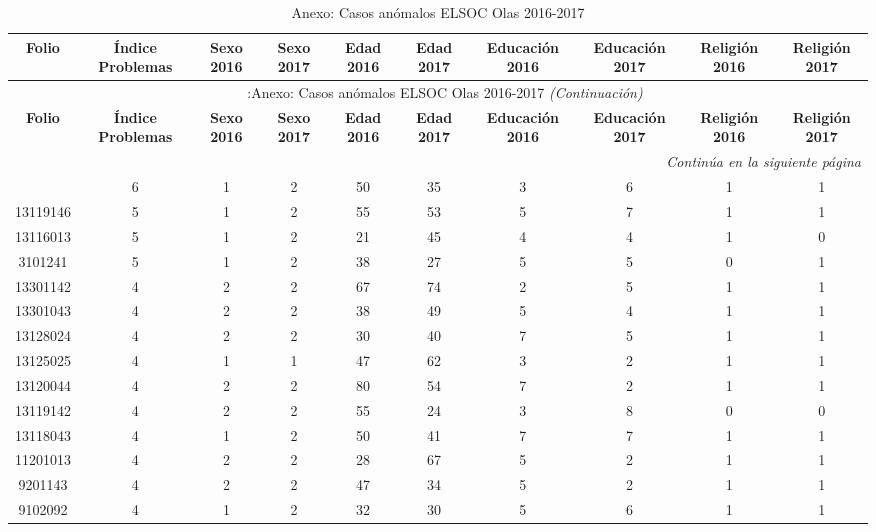\begin{landscape}
	\begin{center}
		\begin{scriptsize}
			\begin{longtable}{cccccccccc}
				\caption{Anexo: Casos anómalos ELSOC Olas 2016-2017}\\
				\toprule
				\textbf{Folio} & \textbf{Índice Problemas} &\textbf{Sexo 2016} & \textbf{Sexo 2017} &\textbf{Edad 2016} &\textbf{Edad 2017} & \textbf{Educación 2016} &\textbf{Educación 2017} &\textbf{Religión 2016} & \textbf{Religión 2017}\\
				\midrule
				\midrule
				\endfirsthead
				\multicolumn{10}{c}{\tablename\ \thetable\ :Anexo: Casos anómalos ELSOC Olas 2016-2017
					\textit{(Continuación)}} \\
				\toprule
				\textbf{Folio} & \textbf{Índice Problemas} &\textbf{Sexo 2016} & \textbf{Sexo 2017} &\textbf{Edad 2016} &\textbf{Edad 2017} & \textbf{Educación 2016} &\textbf{Educación 2017} &\textbf{Religión 2016} & \textbf{Religión 2017}\\
				\midrule		
				\endhead
				\hline \multicolumn{10}{r}{\textit{Continúa en la siguiente página}} \\
				\endfoot
				\hline
				\endlastfoot
				\hline
				7404253 & 6 & 1 & 2 & 50 & 35 & 3 & 6 & 1 & 1 \\ 
				13119146 & 5 & 1 & 2 & 55 & 53 & 5 & 7 & 1 & 1 \\ 
				13116013 & 5 & 1 & 2 & 21 & 45 & 4 & 4 & 1 & 0 \\ 
				3101241 & 5 & 1 & 2 & 38 & 27 & 5 & 5 & 0 & 1 \\ 
				13301142 & 4 & 2 & 2 & 67 & 74 & 2 & 5 & 1 & 1 \\ 
				13301043 & 4 & 2 & 2 & 38 & 49 & 5 & 4 & 1 & 1 \\ 
				13128024 & 4 & 2 & 2 & 30 & 40 & 7 & 5 & 1 & 1 \\ 
				13125025 & 4 & 1 & 1 & 47 & 62 & 3 & 2 & 1 & 1 \\ 
				13120044 & 4 & 2 & 2 & 80 & 54 & 7 & 2 & 1 & 1 \\ 
				13119142 & 4 & 2 & 2 & 55 & 24 & 3 & 8 & 0 & 0 \\ 
				13118043 & 4 & 1 & 2 & 50 & 41 & 7 & 7 & 1 & 1 \\ 
				11201013 & 4 & 2 & 2 & 28 & 67 & 5 & 2 & 1 & 1 \\ 
				9201143 & 4 & 2 & 2 & 47 & 34 & 5 & 2 & 1 & 1 \\ 
				9102092 & 4 & 1 & 2 & 32 & 30 & 5 & 6 & 1 & 1 \\ 

\end{longtable}
\end{scriptsize}
\end{center}
\end{landscape}
